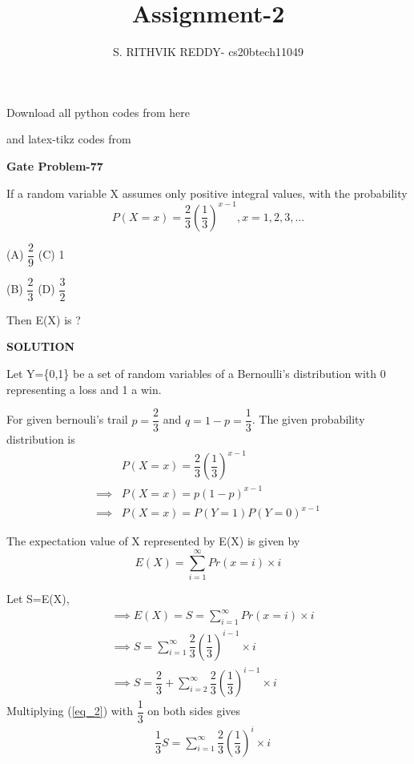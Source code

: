 \documentclass[a4paper]{article}
\title{Assignment-2}
\author{S. RITHVIK REDDY- cs20btech11049}
\date{}
\begin{document}
\maketitle
\noindent
Download all python codes from here

\begin{multicols*}{2}
\noindent
{}
    
\vspace{0.3cm}
and latex-tikz codes from  

\vspace{0.3cm}  
    
   
\vspace{0.5cm}
\textbf{Gate Problem-77}
\vspace{0.5cm}

If a random variable X assumes only positive integral values, with the probability 
$$P(X=x)=\dfrac{2}{3}\left(\dfrac{1}{3}\right)^{x-1} , x=1,2,3,...$$

(A) $\dfrac{2}{9}$ \hspace{2 cm} (C) 1

\vspace{0.5 cm}
(B) $\dfrac{2}{3}$ \hspace{2 cm} (D) $\dfrac{3}{2}$

Then E(X) is ?

\vspace{0.5cm}
\textbf{SOLUTION}
\vspace{0.5cm}

Let Y=\{0,1\} be a set of random variables of a Bernoulli's distribution with 0 representing a loss and 1 a win.

For given bernouli's trail $p=\dfrac{2}{3}$ and $q=1-p=\dfrac{1}{3}$. The given probability distribution is 
\begin{align*}
&P(X=x)=\dfrac{2}{3}\left(\dfrac{1}{3}\right)^{x-1}\\
\implies &P(X=x)=p(1-p)^{x-1}\\
\implies &P(X=x)=P(Y=1)P(Y=0)^{x-1}
\end{align*}

The expectation value of X represented by E(X) is given by
$$E(X)=\sum_{i=1}^{\infty} Pr(x=i)\times i$$

Let S=E(X),
\begin{align}
&\implies E(X)=S=\sum_{i=1}^{\infty} Pr(x=i)\times i\\
&\implies S=\sum_{i=1}^{\infty} \dfrac{2}{3}\left(\dfrac{1}{3}\right)^{i-1} \times i \label{eq_2}   \\
&\implies S=\dfrac{2}{3}+\sum_{i=2}^{\infty} \dfrac{2}{3}\left(\dfrac{1}{3}\right)^{i-1} \times i  \label{eq_3}
\end{align}
Multiplying (\ref{eq_2}) with  $\dfrac{1}{3}$ on both sides gives
\begin{align}
&\dfrac{1}{3}S=\sum_{i=1}^{\infty} \dfrac{2}{3}\left(\dfrac{1}{3}\right)^{i} \times i \label{eq_4}
\end{align}


\end{multicols*}
\end{document}
